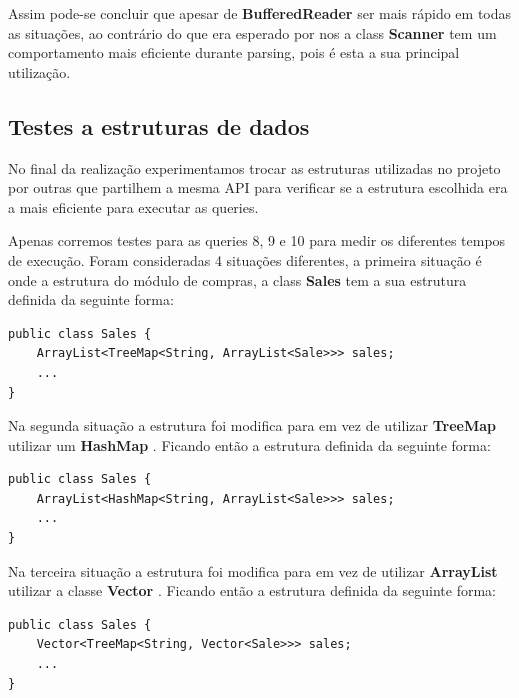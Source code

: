 \documentclass[10pt] {article}
\begin{document}
\newpage

\par Assim pode-se concluir que apesar de  \color{blue} \textbf{BufferedReader} \color{black} ser mais rápido em todas as 
situações, ao contrário do que era esperado por nos a class  \color{blue} \textbf{Scanner} \color{black} tem um comportamento 
mais eficiente durante parsing, pois é esta a sua principal utilização.

\subsection{Testes a estruturas de dados}
\par No final da realização experimentamos trocar as estruturas utilizadas no projeto por outras que partilhem a mesma API 
para verificar se a estrutura escolhida era a mais eficiente para executar as queries.
\par Apenas corremos testes para as queries 8, 9 e 10 para medir os diferentes tempos de execução. 
Foram consideradas 4 situações diferentes, a primeira situação é onde a estrutura do módulo de
compras, a class \color{blue} \textbf{Sales} \color{black} tem a sua estrutura definida da seguinte forma:

\begin{lstlisting}
public class Sales {
	ArrayList<TreeMap<String, ArrayList<Sale>>> sales;
	...
}
\end{lstlisting}

\par Na segunda situação a estrutura foi modifica para em vez de utilizar \color{blue} \textbf{TreeMap} \color{black} utilizar um
\color{blue} \textbf{HashMap} \color{black} . Ficando então a estrutura definida da seguinte forma:

\begin{lstlisting}
public class Sales {
	ArrayList<HashMap<String, ArrayList<Sale>>> sales;
	...
}
\end{lstlisting}

\par Na terceira situação a estrutura foi modifica para em vez de utilizar \color{blue} \textbf{ArrayList} \color{black} utilizar a
classe  \color{blue} \textbf{Vector} \color{black} . Ficando então a estrutura definida da seguinte forma:

\begin{lstlisting}
public class Sales {
	Vector<TreeMap<String, Vector<Sale>>> sales;
	...
}
\end{lstlisting}
\end{document}
